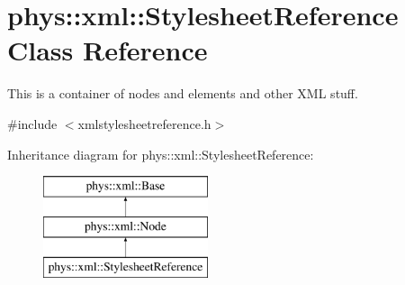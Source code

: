 \hypertarget{classphys_1_1xml_1_1StylesheetReference}{
\section{phys::xml::StylesheetReference Class Reference}
\label{df/d85/classphys_1_1xml_1_1StylesheetReference}
}


This is a container of nodes and elements and other XML stuff.  




{\ttfamily \#include $<$xmlstylesheetreference.h$>$}

Inheritance diagram for phys::xml::StylesheetReference:\begin{figure}[H]
\begin{center}
\leavevmode
\includegraphics[height=3.000000cm]{df/d85/classphys_1_1xml_1_1StylesheetReference}
\end{center}
\end{figure}
